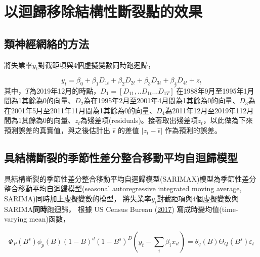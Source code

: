 \documentclass[oneside]{book}
\begin{document}
\hypertarget{ux4ee5ux8ff4ux6b78ux79fbux9664ux7d50ux69cbux6027ux65b7ux88c2ux9edeux7684ux6548ux679c}{%
\section{以迴歸移除結構性斷裂點的效果}\label{ux4ee5ux8ff4ux6b78ux79fbux9664ux7d50ux69cbux6027ux65b7ux88c2ux9edeux7684ux6548ux679c}}

\hypertarget{ux985eux795eux7d93ux7db2ux7d61ux7684ux65b9ux6cd5}{%
\subsection{類神經網絡的方法}\label{ux985eux795eux7d93ux7db2ux7d61ux7684ux65b9ux6cd5}}

將失業率\(y_t\)對截距項與4個虛擬變數同時跑迴歸，

\begin{equation} 
  y_t = \beta_0+ \beta_1D_{1t}+\beta_2D_{2t}+\beta_3D_{3t}+\beta_4D_{4t}+z_t
  \label{eq:zt}
\end{equation}
其中，\(T\)為2019年12月的時點，\(D_1 = [D_{11},..D_{1t}...D_{1T}]^{'}\)在1988年9月至1995年1月間為1其餘為0的向量、\(D_2\)為在1995年2月至2001年4月間為1其餘為0的向量、\(D_3\)為在2001年5月至2011年11月間為1其餘為0的向量、\(D_4\)為2011年12月至2019年112月間為1其餘為0的向量、\(z_t\)為殘差項(residuals)。接著取出殘差項\(z_t\)，以此做為下來預測誤差的真實值，與之後估計出 \(\hat{\epsilon}\) 的差值 \(|z_t-\hat{\epsilon}|\) 作為預測的誤差。

\hypertarget{ux5177ux7d50ux69cbux65b7ux88c2ux7684ux5b63ux7bc0ux6027ux5deeux5206ux6574ux5408ux79fbux52d5ux5e73ux5747ux81eaux8ff4ux6b78ux6a21ux578b}{%
\subsection{具結構斷裂的季節性差分整合移動平均自迴歸模型}\label{ux5177ux7d50ux69cbux65b7ux88c2ux7684ux5b63ux7bc0ux6027ux5deeux5206ux6574ux5408ux79fbux52d5ux5e73ux5747ux81eaux8ff4ux6b78ux6a21ux578b}}

具結構斷裂的季節性差分整合移動平均自迴歸模型(SARIMAX)模型為季節性差分整合移動平均自迴歸模型(seasonal autoregressive integrated moving average, SARIMA)同時加上虛擬變數的模型，
將失業率\(y_t\)對截距項與4個虛擬變數與SARIMA\textbf{同時}跑迴歸，
根據 US Census Bureau (\protect\hyperlink{ref-uscensusbureauX13ARIMASEATSSeasonalAdjustment2017}{2017}) 寫成時變均值(time-varying mean)函數，

\[\Phi_P(B^s)\phi_p(B)(1-B)^d(1-B^s)^D (y_t-\sum_i \beta_ix_{it}) = \theta_q(B)\Theta_Q(B^s)\varepsilon_t\]
\end{document}

